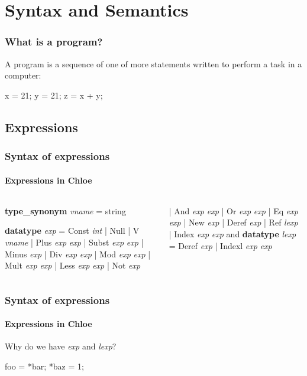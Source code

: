 \section{Syntax and Semantics}

\begin{frame}[fragile]
\frametitle{What is a program?}

A program is a sequence of one of more statements written to perform a task in a computer:

\begin{example}
\begin{semiverbatim}
x = 21;
y = 21;
z = x + y;
\end{semiverbatim}
\end{example}


\end{frame}

\subsection{Expressions}

\begin{frame}[fragile]
\frametitle{Syntax of expressions}
\framesubtitle{Expressions in Chloe}

\begin{columns}[t]
\begin{semiverbatim}
\textbf{type_synonym} \textit{vname} = string

\textbf{datatype} \textit{exp} = Const \textit{int}
  | Null
  | V      \textit{vname}
  | Plus  \textit{exp} \textit{exp}
  | Subst \textit{exp} \textit{exp}
  | Minus \textit{exp}
  | Div   \textit{exp} \textit{exp}
  | Mod   \textit{exp} \textit{exp}
  | Mult  \textit{exp} \textit{exp}
  | Less  \textit{exp} \textit{exp}
  | Not   \textit{exp}
\end{semiverbatim}
\begin{semiverbatim}
  | And   \textit{exp} \textit{exp}
  | Or    \textit{exp} \textit{exp}
  | Eq    \textit{exp} \textit{exp}
  | New   \textit{exp}
  | Deref \textit{exp}
  | Ref   \textit{lexp}
  | Index \textit{exp} \textit{exp}
and
\textbf{datatype} \textit{lexp} = Deref \textit{exp}
  | Indexl \textit{exp} \textit{exp}
\end{semiverbatim}
\end{columns}


\end{frame}


\begin{frame}[fragile]
\frametitle{Syntax of expressions}
\framesubtitle{Expressions in Chloe}

Why do we have \textit{exp} and \textit{lexp}?
\begin{example}
\begin{semiverbatim}
foo = *bar;
*baz = 1;
\end{semiverbatim}
\end{example}



\end{frame}



